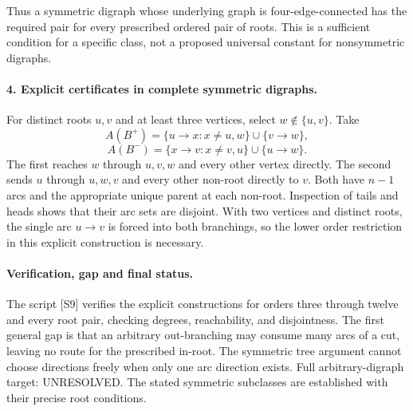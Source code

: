 \documentclass[11pt,a4paper]{article}
\begin{document}
Thus a symmetric digraph whose underlying graph is four-edge-connected
has the required pair for every prescribed ordered pair of roots.
This is a sufficient condition for a specific class, not a proposed
universal constant for nonsymmetric digraphs.

\paragraph{4. Explicit certificates in complete symmetric digraphs.}
For distinct roots $u,v$ and at least three vertices, select
$w\notin\{u,v\}$. Take
\[
 A(B^+)=\{u\to x:x\ne u,w\}\cup\{v\to w\},
\]
\[
 A(B^-)=\{x\to v:x\ne v,u\}\cup\{u\to w\}.
\]
The first reaches $w$ through $u,v,w$ and every other vertex directly.
The second sends $u$ through $u,w,v$ and every other non-root directly
to $v$. Both have $n-1$ arcs and the appropriate unique parent at
each non-root. Inspection of tails and heads shows that their arc
sets are disjoint. With two vertices and distinct roots, the single
arc $u\to v$ is forced into both branchings, so the lower order
restriction in this explicit construction is necessary.

\paragraph{Verification, gap and final status.}
The script [S9] verifies the explicit constructions for orders
three through twelve and every root pair, checking degrees,
reachability, and disjointness. The first general gap is that an
arbitrary out-branching may consume many arcs of a cut, leaving no
route for the prescribed in-root. The symmetric tree argument cannot
choose directions freely when only one arc direction exists.
Full arbitrary-digraph target: UNRESOLVED. The stated symmetric
subclasses are established with their precise root conditions.
\end{document}
